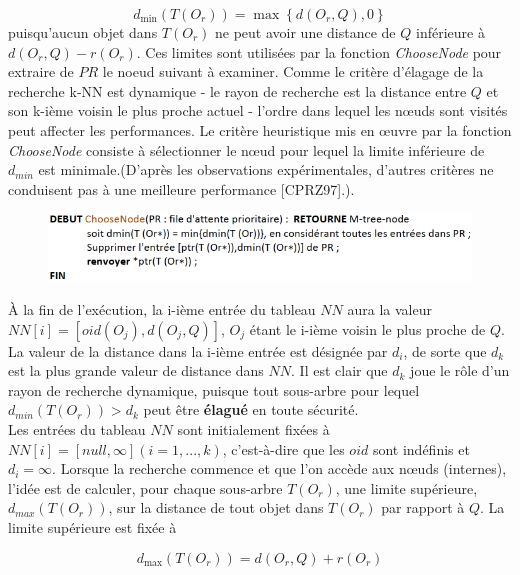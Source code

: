 \begin{equation}
    d_{\min}(T(O_r)) = \max \left\{d(O_r, Q), 0\right\}
\end{equation}
puisqu'aucun objet dans $ T(O_r) $ ne peut avoir une distance de $  Q  $ inférieure à $ d(O_r, Q)-r(O_r) $.
Ces limites sont utilisées par la fonction \textit{ChooseNode} pour extraire de $ PR $ le noeud suivant à examiner. Comme le critère d'élagage de la recherche k-NN est dynamique - le rayon de recherche est la distance entre $ Q $ et son k-ième voisin le plus proche actuel - l'ordre dans lequel les nœuds sont visités peut affecter les performances. Le critère heuristique mis en œuvre par la fonction \textit{ChooseNode} consiste à sélectionner le nœud pour lequel la limite inférieure de $ d_{min} $ est minimale.(D'après les observations expérimentales, d'autres critères ne conduisent pas à une meilleure performance [CPRZ97].).
\begin{figure}[H]
	\centering
	\includegraphics[width=.9 \textwidth]{Figures/choosenode.png} %
\end{figure} 


À la fin de l'exécution, la i-ième entrée du tableau $ NN $ aura la valeur $ NN[i] = [oid(O_j),d(O_j, Q)] $, $ O_j $ étant le i-ième voisin le plus proche de $ Q $. La valeur de la distance dans la i-ième entrée est désignée par $ d_i $, de sorte que $ d_k $ est la plus grande valeur de distance dans $ NN $. Il est clair que $ d_k $ joue le rôle d'un rayon de recherche dynamique, puisque tout sous-arbre pour lequel $ d_{min}(T(O_r)) > d_k $ peut être \textbf{élagué} en toute sécurité.\\

Les entrées du tableau $ NN $ sont initialement fixées à $ NN[i] = [null ,\infty] (i= 1,..., k) $, c'est-à-dire que les $ oid $ sont indéfinis et $ d_i = \infty $. Lorsque la recherche commence et que l'on accède aux nœuds (internes), l'idée est de calculer, pour chaque sous-arbre $ T(O_r) $, une limite supérieure, $ d_{max}(T(O_r)) $, sur la distance de tout objet dans $ T(O_r) $ par rapport à $ Q $. La limite supérieure est fixée à

\begin{equation}
d_{\max}(T(O_r)) =  d(O_r, Q)+r(O_r)
\end{equation}

